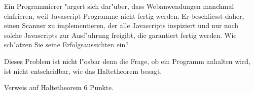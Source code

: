 Ein Programmierer "argert sich dar"uber, dass Webanwendungen manchmal
einfrieren, weil Javascript-Programme nicht fertig werden.
Er beschliesst daher, einen Scanner zu implementieren, der alle
Java\-scripts inspiziert und nur noch solche Javascripts zur Ausf"uhrung
freigibt, die garantiert fertig werden. Wie sch"atzen Sie seine
Erfolgsaussichten ein?

\begin{loesung}
Dieses Problem ist nicht l"osbar denn die Frage, ob ein Programm 
anhalten wird, ist nicht entscheidbar, wie das Haltetheorem besagt.
\end{loesung}

\begin{bewertung}
Verweis auf Haltetheorem 6 Punkte.
\end{bewertung}
